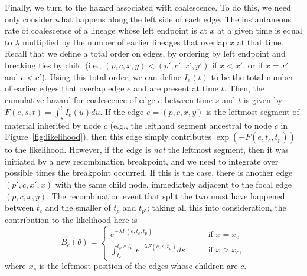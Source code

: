\documentclass{article}
\begin{document}
Finally, we turn to the hazard associated with coalescence.
To do this, we need only consider what happens along the left side
of each edge.
The instantaneous rate of coalescence of a lineage whose left endpoint is at $x$
at a given time is equal to $\lambda$ multiplied
by the number of earlier lineages that overlap $x$ at that time.
Recall that we define a total order on edges,
by ordering by left endpoint and breaking ties by child
(i.e., $(p,c,x,y) < (p',c',x',y')$
if $x<x'$, or if $x=x'$ and $c<c'$).
Using this total order, we can define
$I_e(t)$ to be the total number of earlier edges that overlap edge $e$
and are present at time $t$.
Then, the cumulative hazard for coalescence of edge $e$
between time $s$ and $t$ is given by $F(e, s, t) = \int_{s}^{t} I_{e}(u) du$.
If the edge $e = (p,c,x,y)$
is the leftmost segment of material inherited by node $c$
(e.g., the lefthand segment ancestral to node $c$
in Figure~\ref{fig:likelihood}),
then this edge simply contributes $\exp(-F(e,t_c,t_p))$ to the likelihood.
However, if the edge is \emph{not} the leftmost segment,
then it was initiated by a new recombination breakpoint,
and we need to integrate over possible times the breakpoint occurred.
If this is the case, there is another edge $(p',c,x',x)$ with the same child node,
immediately adjacent to the focal edge $(p,c,x,y)$.
The recombination event that split the two must have happened between $t_c$
and the smaller of $t_p$ and $t_{p'}$;
taking all this into consideration, the contribution to the likelihood here is
\begin{equation}\label{eq:depth}
B_e(\theta) = \begin{cases}
    e^{-\lambda F(e, t_c, t_p)}
        & \qquad \text{if } x=x_{c} \\
    \int_{t_c}^{t_{p} \wedge t_{p'}} e^{-\lambda F(e, s, t_{p})} ds
        & \qquad \text{if } x>x_{c} ,
\end{cases}
\end{equation}
where $x_c$ is the leftmost position of the edges whose children are $c$.

\end{document}
